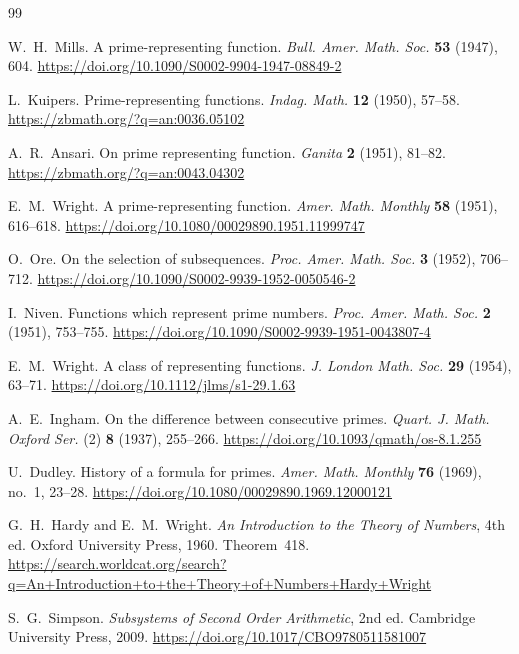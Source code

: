 \documentclass[11pt,reqno]{amsart}
\theoremstyle{blueplain}
\numberwithin{equation}{section}
\begin{document}
\begin{thebibliography}{99}
	
	 W.~H.~Mills. A prime-representing function. \emph{Bull.
		Amer. Math. Soc.} \textbf{53} (1947), 604.
	\url{https://doi.org/10.1090/S0002-9904-1947-08849-2}
	
	 L.~Kuipers. Prime-representing functions. \emph{Indag.
		Math.} \textbf{12} (1950), 57--58.
	\url{https://zbmath.org/?q=an:0036.05102}
	
	 A.~R.~Ansari. On prime representing function. \emph{Ganita}
	\textbf{2} (1951), 81--82.
	\url{https://zbmath.org/?q=an:0043.04302}
	
	 E.~M.~Wright. A prime-representing function. \emph{Amer.
		Math. Monthly} \textbf{58} (1951), 616--618.
	\url{https://doi.org/10.1080/00029890.1951.11999747}
	
	 O.~Ore. On the selection of subsequences. \emph{Proc. Amer.
		Math. Soc.} \textbf{3} (1952), 706--712.
	\url{https://doi.org/10.1090/S0002-9939-1952-0050546-2}
	
	 I.~Niven. Functions which represent prime numbers. \emph{Proc.
		Amer. Math. Soc.} \textbf{2} (1951), 753--755.
	\url{https://doi.org/10.1090/S0002-9939-1951-0043807-4}
	
	 E.~M.~Wright. A class of representing functions. \emph{J.
		London Math. Soc.} \textbf{29} (1954), 63--71.
	\url{https://doi.org/10.1112/jlms/s1-29.1.63}
	
	 A.~E.~Ingham. On the difference between consecutive
	primes. \emph{Quart. J. Math. Oxford Ser.} (2) \textbf{8} (1937), 255--266.
	\url{https://doi.org/10.1093/qmath/os-8.1.255}
	
	 U.~Dudley. History of a formula for primes. \emph{Amer.
		Math. Monthly} \textbf{76} (1969), no.~1, 23--28.
	\url{https://doi.org/10.1080/00029890.1969.12000121}
	
	 G.~H.~Hardy and E.~M.~Wright. \emph{An Introduction to
		the Theory of Numbers}, 4th ed. Oxford University Press, 1960. Theorem~418.
	\url{https://search.worldcat.org/search?q=An+Introduction+to+the+Theory+of+Numbers+Hardy+Wright}
	
	 S.~G.~Simpson. \emph{Subsystems of Second Order
		Arithmetic}, 2nd ed. Cambridge University Press, 2009.
	\url{https://doi.org/10.1017/CBO9780511581007}
	

\end{thebibliography}
\end{document}
